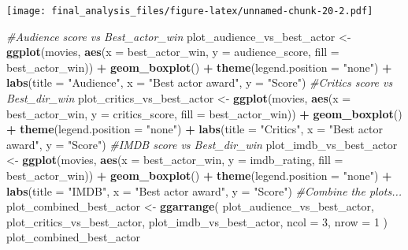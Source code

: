\documentclass[]{article}
\newenvironment{Shaded}{\begin{snugshade}}{\end{snugshade}}
\newcommand{\CommentTok}[1]{\textcolor[rgb]{0.56,0.35,0.01}{\textit{#1}}}
\newcommand{\DataTypeTok}[1]{\textcolor[rgb]{0.13,0.29,0.53}{#1}}
\newcommand{\DecValTok}[1]{\textcolor[rgb]{0.00,0.00,0.81}{#1}}
\newcommand{\KeywordTok}[1]{\textcolor[rgb]{0.13,0.29,0.53}{\textbf{#1}}}
\newcommand{\NormalTok}[1]{#1}
\newcommand{\OperatorTok}[1]{\textcolor[rgb]{0.81,0.36,0.00}{\textbf{#1}}}
\newcommand{\StringTok}[1]{\textcolor[rgb]{0.31,0.60,0.02}{#1}}
\begin{document}
\texttt{[image: final\_analysis\_files/figure-latex/unnamed-chunk-20-2.pdf]}

\begin{Shaded}
\begin{Highlighting}[]
\CommentTok{#Audience score vs Best_actor_win}
\NormalTok{plot_audience_vs_best_actor <-}
\StringTok{  }\KeywordTok{ggplot}\NormalTok{(movies,}
         \KeywordTok{aes}\NormalTok{(}\DataTypeTok{x =}\NormalTok{ best_actor_win, }\DataTypeTok{y =}\NormalTok{ audience_score, }\DataTypeTok{fill =}\NormalTok{ best_actor_win)) }\OperatorTok{+}
\StringTok{  }\KeywordTok{geom_boxplot}\NormalTok{() }\OperatorTok{+}\StringTok{ }\KeywordTok{theme}\NormalTok{(}\DataTypeTok{legend.position =} \StringTok{"none"}\NormalTok{) }\OperatorTok{+}\StringTok{ }\KeywordTok{labs}\NormalTok{(}\DataTypeTok{title =} \StringTok{"Audience"}\NormalTok{, }\DataTypeTok{x =} \StringTok{"Best actor award"}\NormalTok{, }\DataTypeTok{y =} \StringTok{"Score"}\NormalTok{)}
\CommentTok{#Critics score vs Best_dir_win}
\NormalTok{plot_critics_vs_best_actor <-}
\StringTok{  }\KeywordTok{ggplot}\NormalTok{(movies,}
         \KeywordTok{aes}\NormalTok{(}\DataTypeTok{x =}\NormalTok{ best_actor_win, }\DataTypeTok{y =}\NormalTok{ critics_score, }\DataTypeTok{fill =}\NormalTok{ best_actor_win)) }\OperatorTok{+}\StringTok{ }\KeywordTok{geom_boxplot}\NormalTok{() }\OperatorTok{+}\StringTok{ }\KeywordTok{theme}\NormalTok{(}\DataTypeTok{legend.position =} \StringTok{"none"}\NormalTok{) }\OperatorTok{+}\StringTok{ }\KeywordTok{labs}\NormalTok{(}\DataTypeTok{title =} \StringTok{"Critics"}\NormalTok{, }\DataTypeTok{x =} \StringTok{"Best actor award"}\NormalTok{, }\DataTypeTok{y =} \StringTok{"Score"}\NormalTok{)}
\CommentTok{#IMDB score vs Best_dir_win}
\NormalTok{plot_imdb_vs_best_actor <-}
\StringTok{  }\KeywordTok{ggplot}\NormalTok{(movies,}
         \KeywordTok{aes}\NormalTok{(}\DataTypeTok{x =}\NormalTok{ best_actor_win, }\DataTypeTok{y =}\NormalTok{ imdb_rating, }\DataTypeTok{fill =}\NormalTok{ best_actor_win)) }\OperatorTok{+}\StringTok{ }\KeywordTok{geom_boxplot}\NormalTok{() }\OperatorTok{+}\StringTok{ }\KeywordTok{theme}\NormalTok{(}\DataTypeTok{legend.position =} \StringTok{"none"}\NormalTok{) }\OperatorTok{+}\StringTok{ }\KeywordTok{labs}\NormalTok{(}\DataTypeTok{title =} \StringTok{"IMDB"}\NormalTok{, }\DataTypeTok{x =} \StringTok{"Best actor award"}\NormalTok{, }\DataTypeTok{y =} \StringTok{"Score"}\NormalTok{)}
\CommentTok{#Combine the plots...}
\NormalTok{plot_combined_best_actor <-}
\StringTok{  }\KeywordTok{ggarrange}\NormalTok{(}
\NormalTok{    plot_audience_vs_best_actor,}
\NormalTok{    plot_critics_vs_best_actor,}
\NormalTok{    plot_imdb_vs_best_actor,}
    \DataTypeTok{ncol =} \DecValTok{3}\NormalTok{,}
    \DataTypeTok{nrow =} \DecValTok{1}
\NormalTok{  )}
\NormalTok{plot_combined_best_actor}
\end{Highlighting}
\end{Shaded}
\end{document}

